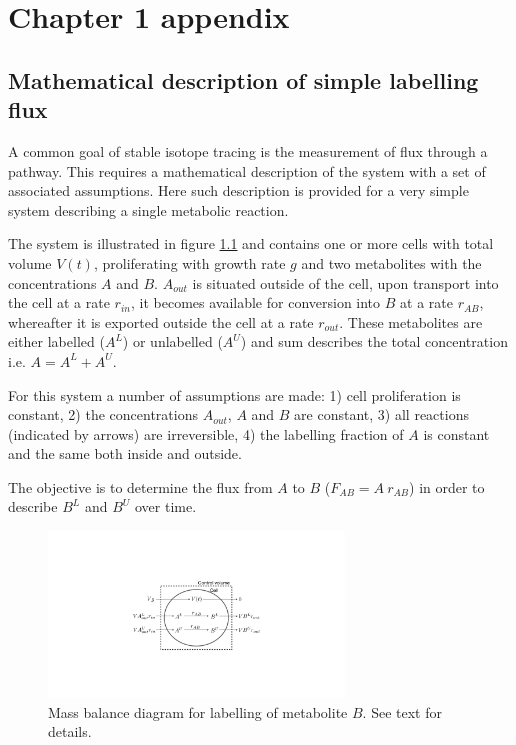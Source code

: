 \chapter{Chapter 1 appendix}
\section{Mathematical description of simple labelling flux}
\label{chap1_app:flux}
A common goal of stable isotope tracing is the measurement of flux through a pathway.
This requires a mathematical description of the system with a set of associated assumptions.
Here such description is provided for a very simple system describing a single metabolic reaction.

The system is illustrated in figure \ref{fig:app_ch1:tracing_diagram} and contains one or more cells with total volume $V(t)$, proliferating with growth rate $g$ and two metabolites with the concentrations $A$ and $B$.
$A_{out}$ is situated outside of the cell, upon transport into the cell at a rate $r_{in}$, it becomes available for conversion into $B$ at a rate $r_{AB}$, whereafter it is exported outside the cell at a rate $r_{out}$.
These metabolites are either labelled ($A^L$) or unlabelled ($A^U$) and sum describes the total concentration i.e. $A = A^L + A^U$.

For this system a number of assumptions are made:
1) cell proliferation is constant,
2) the concentrations $A_{out}$, $A$ and $B$ are constant,
3) all reactions (indicated by arrows) are irreversible,
4) the labelling fraction of $A$ is constant and the same both inside and outside.

The objective is to determine the flux from $A$ to $B$ ($F_{AB} = A\ r_{AB}$) in order to describe $B^L$ and $B^U$ over time.

\begin{figure}[ht]
    \centering
    \includegraphics[width=0.7\textwidth]{figures/chap1/app/tracing_diagram.pdf}
    \caption[Mass balance diagram for metabolite labelling.]{
    Mass balance diagram for labelling of metabolite $B$.
    See text for details.
    }
    \label{fig:app_ch1:tracing_diagram}
\end{figure}


